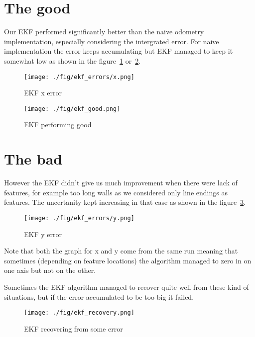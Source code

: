 \documentclass[12pt, a4paper, onecolumn]{article}
\begin{document}
\maketitle

\section{The good}
Our EKF performed significantly better than the naive odometry implementation, especially considering the intergrated error.
For naive implementation the error keeps accumulating but EKF managed to keep it somewhat low as shown in the figure~\ref{fig:err_x} or~\ref{fig:ekf_good}.

\begin{figure}[h!]
  \begin{center}
    \texttt{[image: ./fig/ekf\_errors/x.png]}
  \end{center}
  \caption{EKF x error}
  \label{fig:err_x}
\end{figure}

\begin{figure}[h!]
  \begin{center}
    \texttt{[image: ./fig/ekf\_good.png]}
  \end{center}
  \caption{EKF performing good}
  \label{fig:ekf_good}
\end{figure}


\newpage
\section{The bad}
However the EKF didn't give us much improvement when there were lack of features, for example too long walls as we considered only line endings as features.
The uncertanity kept increasing in that case as shown in the figure~\ref{fig:err_y}.
\begin{figure}[h!]
  \begin{center}
    \texttt{[image: ./fig/ekf\_errors/y.png]}
  \end{center}
  \caption{EKF y error}
  \label{fig:err_y}
\end{figure}
Note that both the graph for x and y come from the same run meaning that sometimes (depending on feature locations) the algorithm managed
to zero in on one axis but not on the other.

Sometimes the EKF algorithm managed to recover quite well from these kind of situations, but if the error accumulated to be too big it failed.
\begin{figure}[h!]
  \begin{center}
    \texttt{[image: ./fig/ekf\_recovery.png]}
  \end{center}
  \caption{EKF recovering from some error}
  \label{fig:ekf_recovery}
\end{figure}
\end{document}
